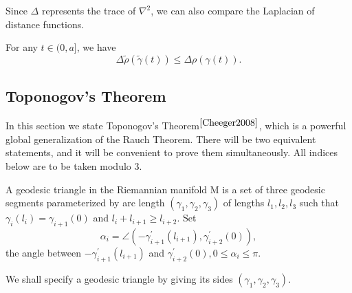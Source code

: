 \documentclass{ctexart}
\begin{document}
Since $\Delta$ represents the trace of $\nabla^2$, we can also compare the Laplacian of distance functions.
\begin{corollary}
  For any $t \in (0, a]$, we have 
  $$
  \Delta \widetilde{\rho}(\widetilde{\gamma}(t)) \leq \Delta \rho(\gamma(t)).
  $$
\end{corollary}

\subsection*{Toponogov's Theorem}

In this section we state Toponogov's Theorem$^{\cite{Cheeger2008}}$, which is a powerful global generalization of the Rauch Theorem. There will be two equivalent statements, and it will be convenient to prove them simultaneously.
All indices below are to be taken modulo 3. 
\begin{definition}
  A geodesic triangle in the Riemannian manifold $\mathrm{M}$ is a set of three geodesic segments parameterized by arc length $\left(\gamma_1, \gamma_2, \gamma_3\right)$ of lengths $l_1, l_2, l_3$ such that $\gamma_i\left(l_i\right)=\gamma_{i+1}(0)$ and $l_i+l_{i+1} \geq l_{i+2}$. Set
  $$
  \alpha_i=\angle\left(-\gamma_{i+1}^{\prime}\left(l_{i+1}\right), \gamma_{i+2}^{\prime}(0)\right),
  $$
  the angle between $-\gamma_{i+1}^{\prime}\left(l_{i+1}\right)$ and $\gamma_{i+2}^{\prime}(0), 0 \leq \alpha_i \leq \pi$.  
\end{definition}
We shall specify a geodesic triangle by giving its sides $\left(\gamma_1, \gamma_2, \gamma_3\right)$.
\end{document}
